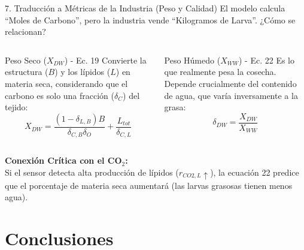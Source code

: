\documentclass[aspectratio=169, 10pt]{beamer}
\begin{document}
\begin{frame}{7. Traducción a Métricas de la Industria (Peso y Calidad)}
    El modelo calcula ``Moles de Carbono'', pero la industria vende ``Kilogramos de Larva''. ¿Cómo se relacionan?

    \vspace{0.2cm}

    \begin{columns}[T]
        \begin{exampleblock}{Peso Seco ($X_{DW}$) - Ec. 19}
            Convierte la estructura ($B$) y los lípidos ($L$) en materia seca, considerando que el carbono es solo una fracción ($\delta_C$) del tejido:
            $$ X_{DW} = \frac{(1-\delta_{L,B})B}{\delta_{C,B}\delta_O} + \frac{L_{tot}}{\delta_{C,L}} $$
        \end{exampleblock}

        \begin{alertblock}{Peso Húmedo ($X_{WW}$) - Ec. 22}
            Es lo que realmente pesa la cosecha. Depende crucialmente del contenido de agua, que varía inversamente a la grasa:
            $$ \delta_{DW} = \frac{X_{DW}}{X_{WW}} $$
        \end{alertblock}
    \end{columns}

    \vspace{0.5cm}
    \centering
    \small
    \textbf{Conexión Crítica con el CO$_2$:}\\
    Si el sensor detecta alta producción de lípidos ($r_{CO2,L} \uparrow$), la ecuación 22 predice que el porcentaje de materia seca aumentará (las larvas grasosas tienen menos agua).
\end{frame}
\section{Conclusiones}
\end{document}

